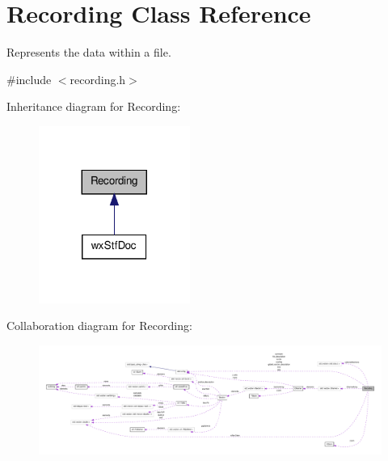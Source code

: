 \hypertarget{classRecording}{
\section{Recording Class Reference}
\label{classRecording}
}


Represents the data within a file.  




{\ttfamily \#include $<$recording.h$>$}



Inheritance diagram for Recording:
\nopagebreak
\begin{figure}[H]
\begin{center}
\leavevmode
\includegraphics[width=140pt]{classRecording__inherit__graph}
\end{center}
\end{figure}


Collaboration diagram for Recording:
\nopagebreak
\begin{figure}[H]
\begin{center}
\leavevmode
\includegraphics[width=400pt]{classRecording__coll__graph}
\end{center}
\end{figure}
